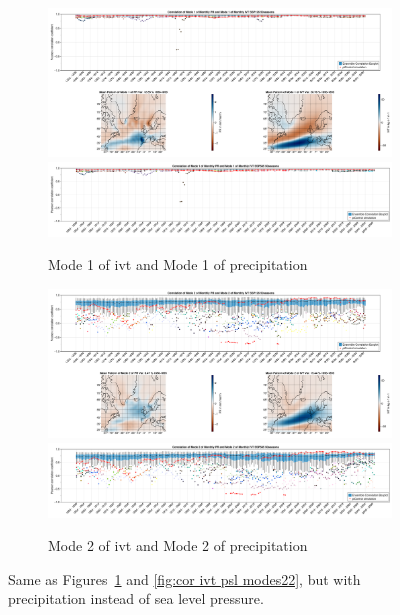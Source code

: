 \begin{figure}[!tbp]
  \begin{subfigure}[b]{0.49\textwidth}
    \includegraphics[width=\textwidth]{figures/correlation_boxplot_pr_ivt_modes11_ssp126_50seasons.png}
    \includegraphics[width=\textwidth]{figures/correlation_boxplot_pr_ivt_modes11_ssp585_50seasons.png}
    \caption{Mode 1 of \ac{ivt} and Mode 1 of precipitation}
    \label{fig:cor pr ivt modes11}
  \end{subfigure}
  \hfill
  \begin{subfigure}[b]{0.49\textwidth}
    \includegraphics[width=\textwidth]{figures/correlation_boxplot_pr_ivt_modes22_ssp126_50seasons.png}
    \includegraphics[width=\textwidth]{figures/correlation_boxplot_pr_ivt_modes22_ssp585_50seasons.png}
    \caption{Mode 2 of \ac{ivt} and Mode 2 of precipitation}
    \label{fig:cor pr ivt modes22}
  \end{subfigure}
  \caption{Same as Figures~\ref{fig:cor pr ivt modes11} and \ref{fig:cor ivt psl modes22}, but with precipitation instead of sea level pressure.}
\end{figure}


